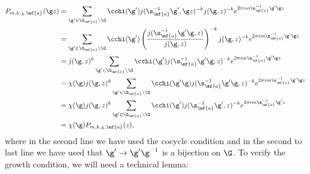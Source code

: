     \begin{align*}
      P_{m,k,\chi,\mf{a}}(\g z) &= \sum_{\g' \in \G_{\mf{a}}\backslash\G}\cchi(\g')j(\s_{\mf{a}}^{-1}\g',\g z)^{-k}j(\g,z)^{-k}e^{2\pi im\s_{\mf{a}}^{-1}\g'\g z} \\
      &= \sum_{\g' \in \G_{\mf{a}}\backslash\G}\cchi(\g')\left(\frac{j(\s_{\mf{a}}^{-1}\g'\g,z)}{j(\g,z)}\right)^{-k}j(\g,z)^{-k}e^{2\pi im\s_{\mf{a}}^{-1}\g'\g z} \\
      &= j(\g,z)^{k}\sum_{\g' \in \G_{\mf{a}}\backslash\G}\cchi(\g')j(\s_{\mf{a}}^{-1}\g'\g,z)^{-k}e^{2\pi im\s_{\mf{a}}^{-1}\g'\g z} \\
      &= \chi(\g)j(\g,z)^{k}\sum_{\g' \in \G_{\mf{a}}\backslash\G}\cchi(\g'\g)j(\s_{\mf{a}}^{-1}\g'\g,z)^{-k}e^{2\pi im\s_{\mf{a}}^{-1}\g'\g z} \\
      &= \chi(\g)j(\g,z)^{k}\sum_{\g' \in \G_{\mf{a}}\backslash\G}\cchi(\g')j(\s_{\mf{a}}^{-1}\g',z)^{-k}e^{2\pi im\s_{\mf{a}}^{-1}\g' z} \\
      &= \chi(\g)P_{m,k,\chi,\mf{a}}(z),
    \end{align*}
    where in the second line we have used the cocycle condition and in the second to last line we have used that $\g' \to \g'\g^{-1}$ is a bijection on $\G$. To verify the growth condition, we will need a technical lemma:

